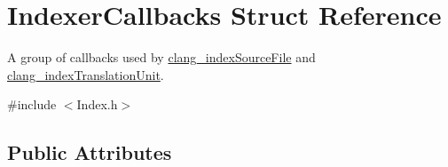 \hypertarget{structIndexerCallbacks}{}\section{Indexer\+Callbacks Struct Reference}
\label{structIndexerCallbacks}


A group of callbacks used by \mbox{\hyperlink{group__CINDEX__HIGH_gaa5c2ad8979779c401b91110d444e2be6}{clang\+\_\+index\+Source\+File}} and \mbox{\hyperlink{group__CINDEX__HIGH_gab12a0795c7d7be6e7ec85679faf3f8e9}{clang\+\_\+index\+Translation\+Unit}}.  




{\ttfamily \#include $<$Index.\+h$>$}

\subsection*{Public Attributes}
